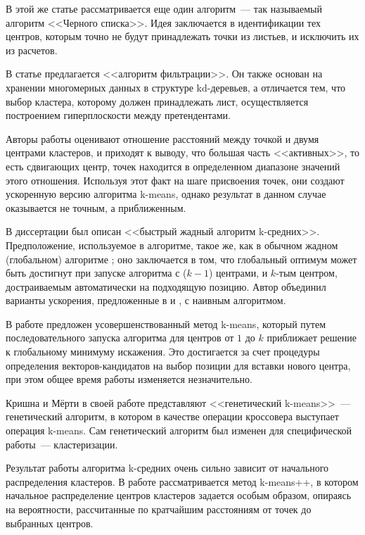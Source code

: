 В этой же статье рассматривается еще один алгоритм~--- так называемый алгоритм <<Черного списка>>. Идея заключается в идентификации тех центров, которым точно не будут принадлежать точки из листьев, и исключить их из расчетов.

В статье \cite{kanungo} предлагается <<алгоритм фильтрации>>. Он также основан на хранении многомерных данных в структуре kd-деревьев, а отличается тем, что выбор кластера, которому должен принадлежать лист, осуществляется построением гиперплоскости между претендентами.

Авторы работы \cite{approxkm} оценивают отношение расстояний между точкой и двумя центрами кластеров, и приходят к выводу, что большая часть <<активных>>, то есть сдвигающих центр, точек находится в определенном диапазоне значений этого отношения. Используя этот факт на шаге присвоения точек, они создают ускоренную версию алгоритма k-means, однако результат в данном случае оказывается не точным, а приближенным.

В диссертации \cite{hussein} был описан <<быстрый жадный алгоритм k-сред\-них>>. Предположение, используемое в алгоритме, такое же, как в обычном жадном (глобальном) алгоритме \cite{likas}; оно заключается в том, что глобальный оптимум может быть достигнут при запуске алгоритма с (\( k-1 \)) центрами, и \( k \)-тым центром, достраиваемым автоматически на подходящую позицию. Автор объединил варианты ускорения, предложенные в \cite{mrkd} и \cite{kanungo}, с наивным алгоритмом.

В работе \cite{hybrid} предложен усовершенствованный метод k-means, который путем последовательного запуска алгоритма для центров от \( 1 \) до \( k \) приближает решение к глобальному минимуму искажения. Это достигается за счет процедуры определения векторов-кандидатов на выбор позиции для вставки нового центра, при этом общее время работы изменяется незначительно.

Кришна и Мёрти в своей работе \cite{krishna} представляют <<генетический k-means>>~--- генетический алгоритм, в котором в качестве операции кроссовера выступает операция k-means. Сам генетический алгоритм был изменен для специфической работы~--- кластеризации.

Результат работы алгоритма k-средних очень сильно зависит от начального распределения кластеров. В работе \cite{kpp} рассматривается метод k-means++, в котором начальное распределение центров кластеров задается особым образом, опираясь на вероятности, рассчитанные по кратчайшим расстояниям от точек до выбранных центров.


